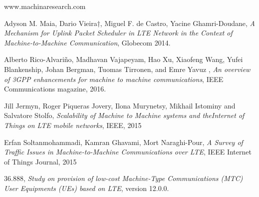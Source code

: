 \documentclass[conference,compsoc]{IEEEtran}
\begin{document}
%
%
%
\begin{thebibliography}{1}

www.machinaresearch.com

Adyson M. Maia, Dario Vieira†, Miguel F. de Castro, Yacine Ghamri-Doudane, \emph{A Mechanism for Uplink Packet Scheduler in LTE Network in the Context of Machine-to-Machine Communication},  Globecom 2014.

Alberto Rico-Alvariño, Madhavan Vajapeyam, Hao Xu, Xiaofeng Wang, Yufei Blankenship, Johan Bergman, Tuomas Tirronen, and Emre Yavuz , \emph{An overview of 3GPP enhancements for machine to machine communications}, IEEE Communications magazine, 2016.

    Jill Jermyn, Roger Piqueras Jovery, Ilona Murynetsy, Mikhail Istominy and Salvatore Stolfo, \emph{Scalability of Machine to Machine systems and theInternet of Things on LTE mobile networks}, IEEE, 2015

    Erfan Soltanmohammadi, Kamran Ghavami, Mort Naraghi-Pour, \emph{A Survey of Traffic Issues in Machine-to-Machine Communications over LTE}, IEEE Internet of Things Journal, 2015

    36.888, \emph{Study on provision of low-cost Machine-Type Communications (MTC) User Equipments (UEs) based on LTE}, version 12.0.0.


\end{thebibliography}




\end{document}
